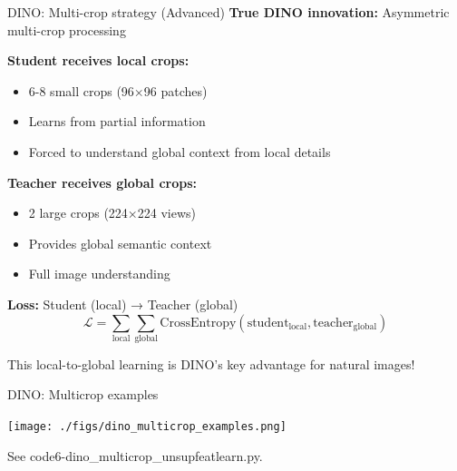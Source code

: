\documentclass{beamer}
\begin{document}
\begin{frame}{DINO: Multi-crop strategy (Advanced)}
\textbf{True DINO innovation:} Asymmetric multi-crop processing

\vspace{0.2cm}

\textbf{Student receives local crops:}
\begin{itemize}
\item 6-8 small crops (96×96 patches) 
\item Learns from \alert{partial information}
\item Forced to understand global context from local details
\end{itemize}

\vspace{0.2cm}

\textbf{Teacher receives global crops:}
\begin{itemize}
\item 2 large crops (224×224 views)
\item Provides \alert{global semantic context}  
\item Full image understanding
\end{itemize}

\vspace{0.2cm}

\textbf{Loss:} Student (local) → Teacher (global)
$$\mathcal{L} = \sum_{\text{local}} \sum_{\text{global}} \text{CrossEntropy}(\text{student}_{\text{local}}, \text{teacher}_{\text{global}})$$

\alert{This local-to-global learning is DINO's key advantage for natural images! }
\end{frame}

\begin{frame}{DINO: Multicrop examples}

  \begin{center}
\texttt{[image: ./figs/dino\_multicrop\_examples.png]}
  \end{center}

  See code6-dino\_multicrop\_unsupfeatlearn.py.
\end{frame}
\end{document}
